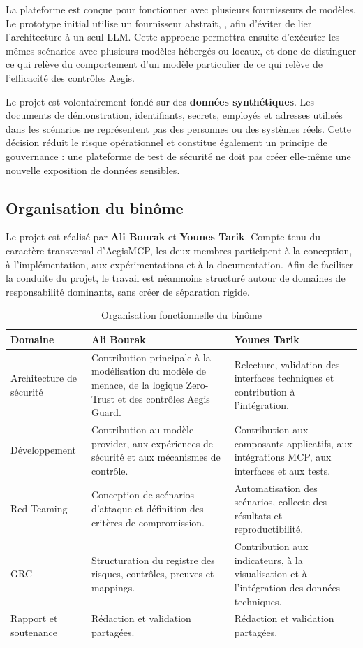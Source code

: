 La plateforme est conçue pour fonctionner avec plusieurs fournisseurs de modèles. Le prototype initial utilise un fournisseur abstrait, , afin d'éviter de lier l'architecture à un seul LLM. Cette approche permettra ensuite d'exécuter les mêmes scénarios avec plusieurs modèles hébergés ou locaux, et donc de distinguer ce qui relève du comportement d'un modèle particulier de ce qui relève de l'efficacité des contrôles Aegis.

Le projet est volontairement fondé sur des \textbf{données synthétiques}. Les documents de démonstration, identifiants, secrets, employés et adresses utilisés dans les scénarios ne représentent pas des personnes ou des systèmes réels. Cette décision réduit le risque opérationnel et constitue également un principe de gouvernance : une plateforme de test de sécurité ne doit pas créer elle-même une nouvelle exposition de données sensibles.

\subsection{Organisation du binôme}

Le projet est réalisé par \textbf{Ali Bourak} et \textbf{Younes Tarik}. Compte tenu du caractère transversal d'AegisMCP, les deux membres participent à la conception, à l'implémentation, aux expérimentations et à la documentation. Afin de faciliter la conduite du projet, le travail est néanmoins structuré autour de domaines de responsabilité dominants, sans créer de séparation rigide.

\begin{table}[H]
\centering
\caption{Organisation fonctionnelle du binôme}
\label{tab:roles-binome}
\begin{tabularx}{\textwidth}{p{3.2cm} X X}
\toprule
\textbf{Domaine} & \textbf{Ali Bourak} & \textbf{Younes Tarik} \\
\midrule
Architecture de sécurité & Contribution principale à la modélisation du modèle de menace, de la logique Zero-Trust et des contrôles Aegis Guard. & Relecture, validation des interfaces techniques et contribution à l'intégration. \\
\addlinespace
Développement & Contribution au modèle provider, aux expériences de sécurité et aux mécanismes de contrôle. & Contribution aux composants applicatifs, aux intégrations MCP, aux interfaces et aux tests. \\
\addlinespace
Red Teaming & Conception de scénarios d'attaque et définition des critères de compromission. & Automatisation des scénarios, collecte des résultats et reproductibilité. \\
\addlinespace
GRC & Structuration du registre des risques, contrôles, preuves et mappings. & Contribution aux indicateurs, à la visualisation et à l'intégration des données techniques. \\
\addlinespace
Rapport et soutenance & Rédaction et validation partagées. & Rédaction et validation partagées. \\
\bottomrule
\end{tabularx}
\end{table}

